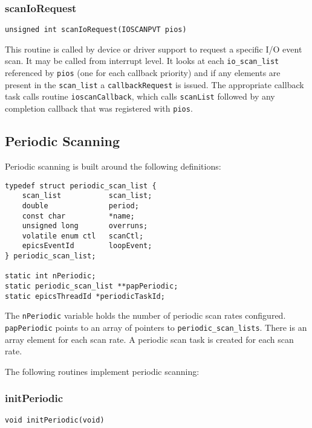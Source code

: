 \subsubsection{scanIoRequest}

\begin{verbatim}
unsigned int scanIoRequest(IOSCANPVT pios)
\end{verbatim}

This routine is called by device or driver support to request a specific I/O event scan.
It may be called from interrupt level.
It looks at each \verb|io_scan_list| referenced by \verb|pios| (one for each callback priority) and if any elements are present in the \verb|scan_list| a \verb|callbackRequest| is issued.
The appropriate callback task calls routine \verb|ioscanCallback|, which calls \verb|scanList| followed by any completion callback that was registered with \verb|pios|.

\subsection{Periodic Scanning}

Periodic scanning is built around the following definitions:

\begin{verbatim}
typedef struct periodic_scan_list {
    scan_list           scan_list;
    double              period;
    const char          *name;
    unsigned long       overruns;
    volatile enum ctl   scanCtl;
    epicsEventId        loopEvent;
} periodic_scan_list;

static int nPeriodic;
static periodic_scan_list **papPeriodic;
static epicsThreadId *periodicTaskId;
\end{verbatim}

The \verb|nPeriodic| variable holds the number of periodic scan rates configured.
\verb|papPeriodic| points to an array of pointers to \verb|periodic_scan_lists|.
There is an array element for each scan rate.
A periodic scan task is created for each scan rate.

The following routines implement periodic scanning:

\subsubsection{initPeriodic}

\begin{verbatim}
void initPeriodic(void)
\end{verbatim}


